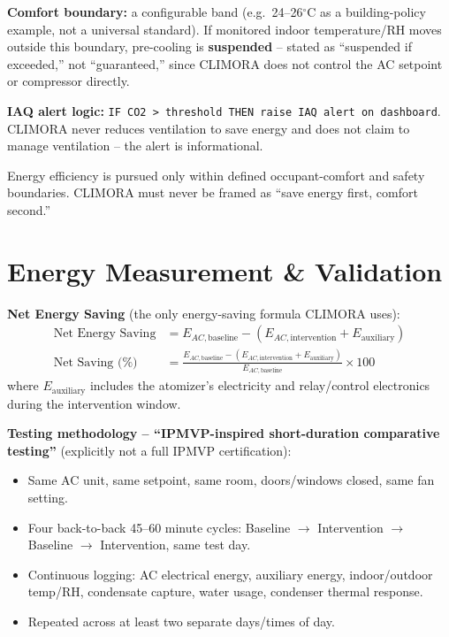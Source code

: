 \documentclass[11pt,a4paper]{article}
\begin{document}
\textbf{Comfort boundary:} a configurable band (e.g.\ 24--26$^\circ$C as a building-policy example, not a universal standard). If monitored indoor temperature/RH moves outside this boundary, pre-cooling is \textbf{suspended} -- stated as ``suspended if exceeded,'' not ``guaranteed,'' since CLIMORA does not control the AC setpoint or compressor directly.

\textbf{IAQ alert logic:} \texttt{IF CO2 > threshold THEN raise IAQ alert on dashboard}. CLIMORA never reduces ventilation to save energy and does not claim to manage ventilation -- the alert is informational.

\begin{limitation}
Energy efficiency is pursued only within defined occupant-comfort and safety boundaries. CLIMORA must never be framed as ``save energy first, comfort second.''
\end{limitation}

\section{Energy Measurement \& Validation}
\label{sec:energy}

\textbf{Net Energy Saving} (the only energy-saving formula CLIMORA uses):
\begin{align}
\text{Net Energy Saving} &= E_{AC,\text{baseline}} - \left(E_{AC,\text{intervention}} + E_{\text{auxiliary}}\right) \\
\text{Net Saving (\%)} &= \frac{E_{AC,\text{baseline}} - \left(E_{AC,\text{intervention}} + E_{\text{auxiliary}}\right)}{E_{AC,\text{baseline}}} \times 100
\end{align}
where $E_{\text{auxiliary}}$ includes the atomizer's electricity and relay/control electronics during the intervention window.

\textbf{Testing methodology -- ``IPMVP-inspired short-duration comparative testing''} (explicitly not a full IPMVP certification):
\begin{itemize}
    \item Same AC unit, same setpoint, same room, doors/windows closed, same fan setting.
    \item Four back-to-back 45--60 minute cycles: Baseline $\rightarrow$ Intervention $\rightarrow$ Baseline $\rightarrow$ Intervention, same test day.
    \item Continuous logging: AC electrical energy, auxiliary energy, indoor/outdoor temp/RH, condensate capture, water usage, condenser thermal response.
    \item Repeated across at least two separate days/times of day.
\end{itemize}
\end{document}
